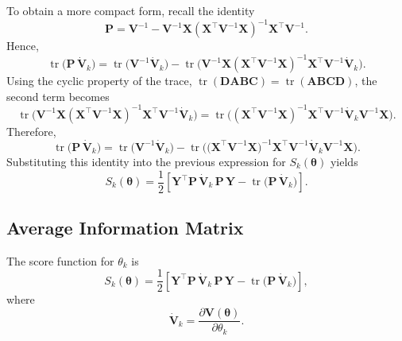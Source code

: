 \documentclass[
  letterpaper,
  DIV=11,
  numbers=noendperiod]{scrartcl}
\begin{document}
To obtain a more compact form, recall the identity \begin{equation}
\symbf{P}
=
\symbf{V}^{-1}
-
\symbf{V}^{-1}\symbf{X}
\left(
\symbf{X}^\top \symbf{V}^{-1}\symbf{X}
\right)^{-1}
\symbf{X}^\top \symbf{V}^{-1}.
\end{equation} Hence, \begin{equation}
\operatorname{tr}\!\big(\symbf{P}\,\dot{\symbf{V}}_k\big)
=
\operatorname{tr}\!\big(\symbf{V}^{-1}\dot{\symbf{V}}_k\big)
-
\operatorname{tr}\!\Big(
\symbf{V}^{-1}\symbf{X}
\left(
\symbf{X}^\top \symbf{V}^{-1}\symbf{X}
\right)^{-1}
\symbf{X}^\top \symbf{V}^{-1}
\dot{\symbf{V}}_k
\Big).
\end{equation} Using the cyclic property of the trace,
\(\operatorname{tr}(\symbf{D}\symbf{A}\symbf{B}\symbf{C})
=
\operatorname{tr}(\symbf{A}\symbf{B}\symbf{C}\symbf{D})\), the second
term becomes \begin{equation}
\operatorname{tr}\!\Big(
\symbf{V}^{-1}\symbf{X}
\left(
\symbf{X}^\top \symbf{V}^{-1}\symbf{X}
\right)^{-1}
\symbf{X}^\top \symbf{V}^{-1}
\dot{\symbf{V}}_k
\Big)
=
\operatorname{tr}\!\Big(
\left(
\symbf{X}^\top \symbf{V}^{-1}\symbf{X}
\right)^{-1}
\symbf{X}^\top \symbf{V}^{-1}
\dot{\symbf{V}}_k
\symbf{V}^{-1}\symbf{X}
\Big).
\end{equation} Therefore, \begin{equation}
\operatorname{tr}\!\big(\symbf{P}\,\dot{\symbf{V}}_k\big)
=
\operatorname{tr}\!\big(\symbf{V}^{-1}\dot{\symbf{V}}_k\big)
-
\operatorname{tr}\!\Big(
\big(\symbf{X}^\top \symbf{V}^{-1}\symbf{X}\big)^{-1}
\symbf{X}^\top \symbf{V}^{-1}
\dot{\symbf{V}}_k
\symbf{V}^{-1}\symbf{X}
\Big).
\end{equation} Substituting this identity into the previous expression
for \(S_k(\symbf{\theta})\) yields \begin{equation}
\label{eq-score}
\boxed{
S_k(\symbf{\theta})
=
\frac{1}{2}
\left[
\symbf{Y}^\top \symbf{P}\,\dot{\symbf{V}}_k\,\symbf{P}\,\symbf{Y}
-
\operatorname{tr}\!\big(\symbf{P}\,\dot{\symbf{V}}_k\big)
\right]
}.
\end{equation}

\subsection{Average Information
Matrix}\label{average-information-matrix}

The score function for \(\theta_k\) is \begin{equation}
S_k(\symbf{\theta})
=
\frac{1}{2}
\left[
\symbf{Y}^\top \symbf{P}\,\dot{\symbf{V}}_k\,\symbf{P}\,\symbf{Y}
-
\operatorname{tr}\!\big(\symbf{P}\,\dot{\symbf{V}}_k\big)
\right],
\end{equation} where \begin{equation}
\dot{\symbf{V}}_k
=
\frac{\partial \symbf{V}(\symbf{\theta})}{\partial \theta_k}.
\end{equation}
\end{document}
